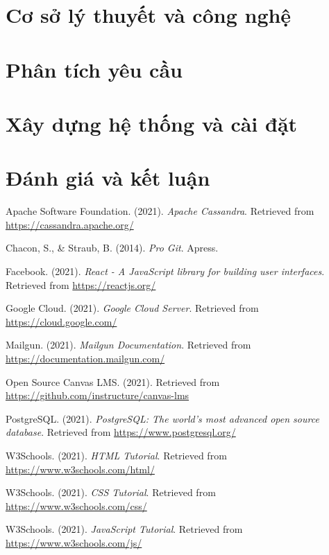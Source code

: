 \documentclass[a4paper,12pt,oneside]{report}
\theoremstyle{definition}
\begin{document}
\newpage
\pagestyle{fancy} %
\chapter{Cơ sở lý thuyết và công nghệ}


\newpage
\pagestyle{fancy} %
\chapter{Phân tích yêu cầu}


\newpage
\pagestyle{fancy} %
\chapter{Xây dựng hệ thống và cài đặt}


\newpage
\pagestyle{fancy} %
\chapter{Đánh giá và kết luận}


\newpage
\renewcommand{\bibname}{Tài liệu tham khảo}
\begin{thebibliography}{9}

  Apache Software Foundation. (2021). \textit{Apache Cassandra}. Retrieved from \url{https://cassandra.apache.org/}
  
  Chacon, S., \& Straub, B. (2014). \textit{Pro Git}. Apress.
  
  Facebook. (2021). \textit{React - A JavaScript library for building user interfaces}. Retrieved from \url{https://reactjs.org/}
  
  Google Cloud. (2021). \textit{Google Cloud Server}. Retrieved from \url{https://cloud.google.com/}
  
  Mailgun. (2021). \textit{Mailgun Documentation}. Retrieved from \url{https://documentation.mailgun.com/}
  
  Open Source Canvas LMS. (2021). Retrieved from \url{https://github.com/instructure/canvas-lms}
  
  PostgreSQL. (2021). \textit{PostgreSQL: The world's most advanced open source database}. Retrieved from \url{https://www.postgresql.org/}
  
  W3Schools. (2021). \textit{HTML Tutorial}. Retrieved from \url{https://www.w3schools.com/html/}
  
  W3Schools. (2021). \textit{CSS Tutorial}. Retrieved from \url{https://www.w3schools.com/css/}
  
  W3Schools. (2021). \textit{JavaScript Tutorial}. Retrieved from \url{https://www.w3schools.com/js/}
  
\end{thebibliography}
  
\nocite{*} %
\pagestyle{plain}
\printbibliography %
\end{document}
